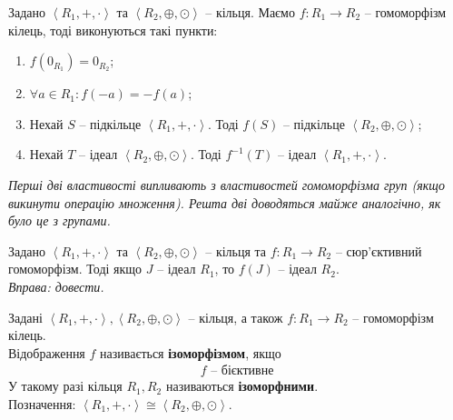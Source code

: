\documentclass{math_library}
\begin{document}
\begin{theorem}
Задано $\left<R_1, +, \cdot \right>$ та $\left<R_2, \oplus, \odot \right>$ -- кільця. Маємо $f \colon R_1 \to R_2$ -- гомоморфізм кілець, тоді виконуються такі пункти:
\begin{enumerate}[nosep,wide=0pt,label={\arabic*)}]
\item $f(0_{R_1}) = 0_{R_2}$;
\item $\forall a \in R_1: f(-a) = -f(a)$;
\item Нехай $S$ -- підкільце $\left<R_1,+,\cdot \right>$. Тоді $f(S)$ -- підкільце $\left<R_2, \oplus, \odot \right>$;
\item Нехай $T$ -- ідеал $\left<R_2, \oplus, \odot \right>$. Тоді $f^{-1}(T)$ -- ідеал $\left<R_1,+,\cdot \right>$.
\end{enumerate}
\textit{Перші дві властивості випливають з властивостей гомоморфізма груп (якщо викинути операцію множення). Решта дві доводяться майже аналогічно, як було це з групами.}
\end{theorem}

\begin{theorem}
Задано $\left<R_1, +, \cdot \right>$ та $\left<R_2, \oplus, \odot \right>$ -- кільця та $f \colon R_1 \to R_2$ -- сюр'єктивний гомоморфізм. Тоді якщо $J$ -- ідеал $R_1$, то $f(J)$ -- ідеал $R_2$.\\
\textit{Вправа: довести.}
\end{theorem}

\begin{definition}
Задані $\left<R_1, +, \cdot \right>, \left<R_2, \oplus, \odot \right>$ -- кільця, а також $f \colon R_1 \to R_2$ -- гомоморфізм кілець.\\
Відображення $f$ називається \textbf{ізоморфізмом}, якщо
\begin{align*}
f \text{ -- бієктивне}
\end{align*}
У такому разі кільця $R_1,R_2$ називаються \textbf{ізоморфними}.\\
Позначення: $\left<R_1,+,\cdot \right> \cong \left<R_2, \oplus, \odot \right>$.
\end{definition}
\end{document}
